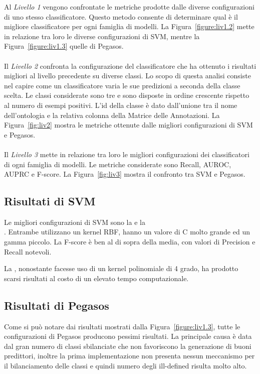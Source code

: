 Al \textit{Livello 1} vengono confrontate le metriche prodotte dalle diverse configurazioni di uno stesso classificatore. Questo metodo consente di determinare qual è il migliore classificatore per ogni famiglia di modelli. La Figura~\ref{figure:liv1.2} mette in relazione tra loro le diverse configurazioni di SVM, mentre la Figura~\ref{figure:liv1.3} quelle di Pegasos.

\paragraph*{}
Il \textit{Livello 2} confronta la configurazione del classificatore che ha ottenuto i risultati migliori al livello precedente su diverse classi. Lo scopo di questa analisi consiste nel capire come un classificatore varia le sue predizioni a seconda della classe scelta. Le classi considerate sono tre e sono disposte in ordine crescente rispetto al numero di esempi positivi. L'id della classe è dato dall'unione tra il nome dell'ontologia e la relativa colonna della Matrice delle Annotazioni.
La Figura~\ref{fig:liv2} mostra le metriche ottenute dalle migliori configurazioni di SVM e Pegasos.

\paragraph*{}
Il \textit{Livello 3} mette in relazione tra loro le migliori configurazioni dei classificatori di ogni famiglia di modelli. Le metriche considerate sono Recall, AUROC, AUPRC e F-score. La Figura~\ref{fig:liv3} mostra il confronto tra SVM e Pegasos.

\subsection{Risultati di SVM}
Le migliori configurazioni di SVM sono la  e la \\ . Entrambe utilizzano un kernel RBF, hanno un valore di C molto grande ed un gamma piccolo. La F-score è ben al di sopra della media, con valori di Precision e Recall notevoli. 

La , nonostante facesse uso di un kernel polinomiale di 4 grado, ha prodotto scarsi risultati al costo di un elevato tempo computazionale.

\subsection{Risultati di Pegasos}
Come si può notare dai risultati mostrati dalla Figura~\ref{figure:liv1.3}, tutte le configurazioni di Pegasos producono pessimi risultati. La principale causa è data dal gran numero di classi sbilanciate che non favoriscono la generazione di buoni predittori, inoltre la prima implementazione non presenta nessun meccanismo per il bilanciamento delle classi e quindi numero degli ill-defined risulta molto alto.


